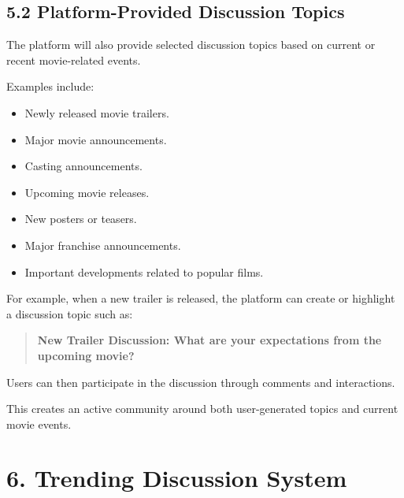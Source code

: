 \documentclass[11pt,a4paper]{article}
\begin{document}
\subsection{5.2 Platform-Provided Discussion Topics}

The platform will also provide selected discussion topics based on current or recent movie-related events.

Examples include:

\begin{itemize}

    \item Newly released movie trailers.

    \item Major movie announcements.

    \item Casting announcements.

    \item Upcoming movie releases.

    \item New posters or teasers.

    \item Major franchise announcements.

    \item Important developments related to popular films.

\end{itemize}

For example, when a new trailer is released, the platform can create or highlight a discussion topic such as:

\begin{quote}

\textbf{New Trailer Discussion: What are your expectations from the upcoming movie?}

\end{quote}

Users can then participate in the discussion through comments and interactions.

This creates an active community around both user-generated topics and current movie events.



\section{6. Trending Discussion System}
\end{document}

